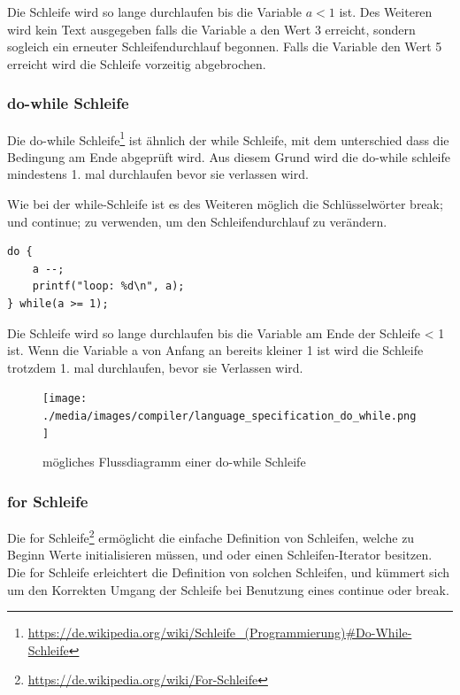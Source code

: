 Die Schleife wird so lange durchlaufen bis die Variable $a < 1$ ist. Des Weiteren wird kein Text ausgegeben falls die Variable a den Wert 3 erreicht, sondern sogleich ein erneuter Schleifendurchlauf begonnen. Falls die Variable den Wert 5 erreicht wird die Schleife vorzeitig abgebrochen.

\newpage
\subsubsection{do-while Schleife}

Die do-while Schleife\footnote{\url{https://de.wikipedia.org/wiki/Schleife_(Programmierung)\#Do-While-Schleife}} ist \"ahnlich der while Schleife, mit dem unterschied dass die Bedingung am Ende abgepr\"uft wird. Aus diesem Grund wird die do-while schleife mindestens 1. mal durchlaufen bevor sie verlassen wird.

Wie bei der while-Schleife ist es des Weiteren m\"oglich die Schl\"usselw\"orter break; und continue; zu verwenden, um den Schleifendurchlauf zu ver\"andern.


\begin{lstlisting}[language=CMM]
do {
	a --;
	printf("loop: %d\n", a);
} while(a >= 1);
\end{lstlisting}

Die Schleife wird so lange durchlaufen bis die Variable am Ende der Schleife < 1 ist. Wenn die Variable a von Anfang an bereits kleiner 1 ist wird die Schleife trotzdem 1. mal durchlaufen, bevor sie Verlassen wird.

\begin{figure}[h]
\centering
\texttt{[image: ./media/images/compiler/language\_specification\_do\_while.png]}
\caption{m\"ogliches Flussdiagramm einer do-while Schleife}
\label{language_specification_do_while}
\end{figure}

\newpage
\subsubsection{for Schleife}

Die for Schleife\footnote{\url{https://de.wikipedia.org/wiki/For-Schleife}} erm\"oglicht die einfache Definition von Schleifen, welche zu Beginn Werte initialisieren m\"ussen, und oder einen Schleifen-Iterator besitzen. Die for Schleife erleichtert die Definition von solchen Schleifen, und k\"ummert sich um den Korrekten Umgang der Schleife bei Benutzung eines continue oder break.

